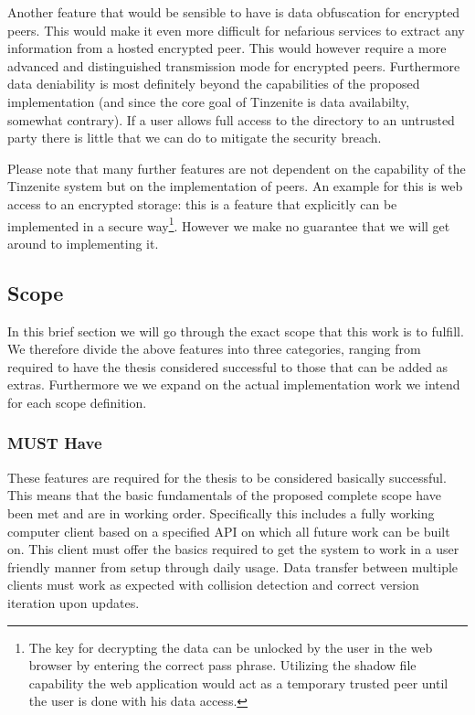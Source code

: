 Another feature that would be sensible to have is data obfuscation for encrypted peers.
This would make it even more difficult for nefarious services to extract any information from a hosted encrypted peer.
This would however require a more advanced and distinguished transmission mode for encrypted peers.
Furthermore data deniability is most definitely beyond the capabilities of the proposed implementation (and since the core goal of Tinzenite is data availabilty, somewhat contrary).
If a user allows full access to the directory to an untrusted party there is little that we can do to mitigate the security breach.

Please note that many further features are not dependent on the capability of the Tinzenite system but on the implementation of peers.
An example for this is web access to an encrypted storage: this is a feature that explicitly can be implemented in a secure way\footnote{The key for decrypting the data can be unlocked by the user in the web browser by entering the correct pass phrase. Utilizing the shadow file capability the web application would act as a temporary trusted peer until the user is done with his data access.}.
However we make no guarantee that we will get around to implementing it.

\subsection{Scope}

In this brief section we will go through the exact scope that this work is to fulfill.
We therefore divide the above features into three categories, ranging from required to have the thesis considered successful to those that can be added as extras.
Furthermore we we expand on the actual implementation work we intend for each scope definition.

\subsubsection{MUST Have}
\label{subs:MUST Have}

These features are required for the thesis to be considered basically successful.
This means that the basic fundamentals of the proposed complete scope have been met and are in working order.
Specifically this includes a fully working computer client based on a specified API on which all future work can be built on.
This client must offer the basics required to get the system to work in a user friendly manner from setup through daily usage.
Data transfer between multiple clients must work as expected with collision detection and correct version iteration upon updates.

